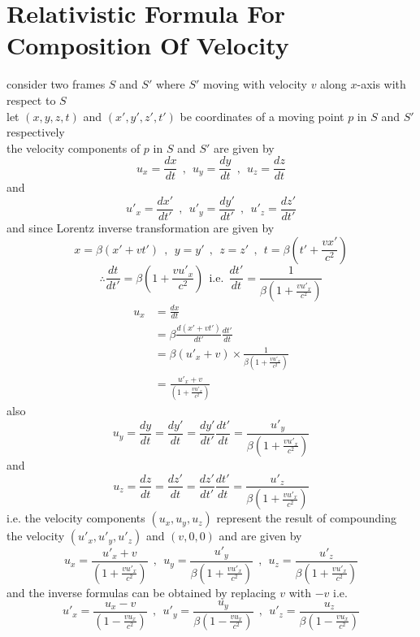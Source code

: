 \documentclass{article}
\begin{document}
\newpage
\section{Relativistic Formula For Composition Of Velocity}
consider two frames $S$ and $S'$ where $S'$ moving with velocity $v$ along $x$-axis
with respect to $S$\\
let $(x,y,z,t)$ and $(x',y',z',t')$ be coordinates of a moving point $p$ in $S$ and $S'$ respectively\\
the velocity components of $p$ in $S$ and $S'$ are given by 
\[
u_x = \frac{dx}{dt} \ \ , \ \  u_y = \frac{dy}{dt} \ \ , \ \  u_z = \frac{dz}{dt}
\]
and 
\[
    u'_x = \frac{dx'}{dt'} \ \ , \ \  u'_y = \frac{dy'}{dt'} \ \ , \ \  u'_z = \frac{dz'}{dt'}
\]
and since Lorentz inverse transformation are given by 
\[
x= \beta(x'+vt') \ \ , \ \ y = y' \ \ , \ \ z = z' \ \ , \ \ t =\beta\left(t' + \frac{vx'}{c^2}\right)
\]
\[
    \therefore \frac{dt}{dt'} = \beta\left(1 + \frac{vu'_x}{c^2}\right) \ \ \text{i.e.} \ \ \frac{dt'}{dt} = \frac{1}{\beta\left(1 + \frac{vu'_x}{c^2}\right)}
\]
\begin{align*}
    u_x &= \frac{dx}{dt}\\
        &= \beta\frac{d(x'+vt')}{dt'} \frac{dt'}{dt}\\
        &= \beta(u'_x + v) \times \frac{1}{\beta\left(1 + \frac{vu'_x}{c^2}\right)}\\
        &= \frac{u'_x + v}{\left(1 + \frac{vu'_x}{c^2}\right)}
\end{align*}
also
\[
u_y = \frac{dy}{dt} = \frac{dy'}{dt} = \frac{dy'}{dt'}\frac{dt'}{dt} = \frac{u'_y}{\beta\left(1 + \frac{vu'_x}{c^2}\right)}
\]
and
\[
u_z = \frac{dz}{dt} = \frac{dz'}{dt} = \frac{dz'}{dt'}\frac{dt'}{dt} = \frac{u'_z}{\beta\left(1 + \frac{vu'_x}{c^2}\right)}
\]
i.e. the velocity components $(u_x,u_y,u_z)$ represent the result of compounding the velocity $(u'_x,u'_y,u'_z)$ and $(v,0,0)$ and are given by 
\[
    u_x = \frac{u'_x + v}{\left(1 + \frac{vu'_x}{c^2}\right)}
    \ \ , \ \ 
    u_y = \frac{u'_y}{\beta\left(1 + \frac{vu'_x}{c^2}\right)}
    \ \ , \ \ 
    u_z = \frac{u'_z}{\beta\left(1 + \frac{vu'_x}{c^2}\right)}
\]
and the inverse formulas can be obtained by replacing $v$ with $-v$ i.e.
\[
    u'_x = \frac{u_x - v}{\left(1 - \frac{vu_x}{c^2}\right)}
    \ \ , \ \ 
    u'_y = \frac{u_y}{\beta\left(1 - \frac{vu_x}{c^2}\right)}
    \ \ , \ \ 
    u'_z = \frac{u_z}{\beta\left(1 - \frac{vu_x}{c^2}\right)}
\]
\pagebreak
\end{document}
